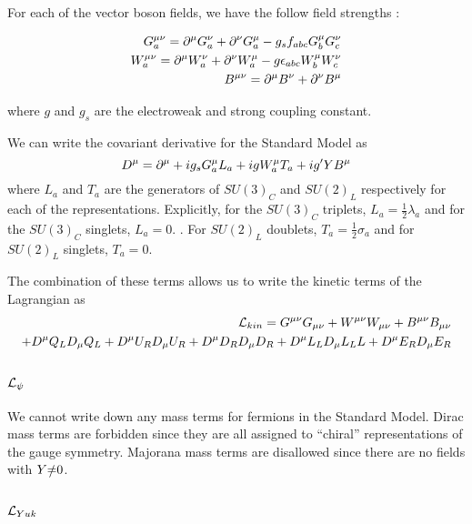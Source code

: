For each of the vector boson fields, we have the follow field strengths :

\begin{equation}
\begin{aligned}
G^{\mu\nu}_a = \partial^\mu G^\nu_a + \partial^\nu G^\mu_a - g_s f_{abc} G^\mu_b G^\nu_c \\
W^{\mu\nu}_a = \partial^\mu W^\nu_a + \partial^\nu W^\mu_a - g \epsilon_{abc} W_b^\mu W_c^\nu \\
B^{\mu\nu}   = \partial^\mu B^\nu   + \partial^\nu B^\mu
\end{aligned}
\end{equation}

where $g$ and $g_s$ are the electroweak and strong coupling constant.

We can write the covariant derivative for the Standard Model as
\begin{equation}
D^\mu = \partial^\mu + ig_s G^\mu_a L_a + i g W^\mu_a T_a + i g' Y B^\mu
\end{equation}
where $L_a$ and $T_a$ are the generators of $SU(3)_C $ and $SU(2)_L$ respectively for each of the representations.
Explicitly, for the $SU(3)_C$ triplets, $L_a = \frac{1}{2} \lambda_a$ and for the $SU(3)_C$ singlets, $L_a = 0$. .
For $SU(2)_L$ doublets, $T_a = \frac{1}{2} \sigma_a $ and for $SU(2)_L$ singlets, $T_a = 0$.

The combination of these terms allows us to write the kinetic terms of the Lagrangian as
\begin{equation}
\begin{aligned}
\mathcal{L}_{kin} = G^{\mu\nu} G_{\mu\nu} + W^{\mu\nu} W_{\mu\nu} + B^{\mu\nu} B_{\mu\nu}\\
 + D^\mu Q_L D_\mu Q_L + D^\mu U_R D_\mu U_R +  D^\mu D_R D_\mu D_R + D^\mu L_L D_\mu L_LL + D^\mu E_R D_\mu E_R
\end{aligned}
\end{equation}

\subsection{$\mathcal{L}_{\psi}$ }

We cannot write down any mass terms for fermions in the Standard Model.
Dirac mass terms are forbidden since they are all assigned to ``chiral'' representations of the gauge symmetry.
Majorana mass terms are disallowed since there are no fields with $Y \slashed{=} 0$.

\subsection{$\mathcal{L}_{Yuk}$ }

